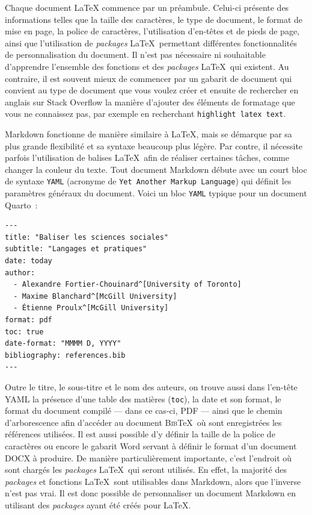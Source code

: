 \documentclass[
  letterpaper,
]{scrbook}
\begin{document}
Chaque document \LaTeX{} commence par un préambule. Celui-ci présente
des informations telles que la taille des caractères, le type de
document, le format de mise en page, la police de caractères,
l'utilisation d'en-têtes et de pieds de page, ainsi que l'utilisation de
\emph{packages} \LaTeX~permettant différentes fonctionnalités de
personnalisation du document. Il n'est pas nécessaire ni souhaitable
d'apprendre l'ensemble des fonctions et des \emph{packages} \LaTeX~qui
existent. Au contraire, il est souvent mieux de commencer par un gabarit
de document qui convient au type de document que vous voulez créer et
ensuite de rechercher en anglais sur Stack Overflow la manière d'ajouter
des éléments de formatage que vous ne connaissez pas, par exemple en
recherchant \texttt{highlight\ latex\ text}.

Markdown fonctionne de manière similaire à \LaTeX, mais se démarque par
sa plus grande flexibilité et sa syntaxe beaucoup plus légère. Par
contre, il nécessite parfois l'utilisation de balises \LaTeX~afin de
réaliser certaines tâches, comme changer la couleur du texte. Tout
document Markdown débute avec un court bloc de syntaxe \texttt{YAML}
(acronyme de \texttt{Yet\ Another\ Markup\ Language}) qui définit les
paramètres généraux du document. Voici un bloc \texttt{YAML} typique
pour un document Quarto~:

\begin{verbatim}
---
title: "Baliser les sciences sociales"
subtitle: "Langages et pratiques"
date: today
author:
  - Alexandre Fortier-Chouinard^[University of Toronto]
  - Maxime Blanchard^[McGill University]
  - Étienne Proulx^[McGill University]
format: pdf
toc: true
date-format: "MMMM D, YYYY"
bibliography: references.bib
---
\end{verbatim}

Outre le titre, le sous-titre et le nom des auteurs, on trouve aussi
dans l'en-tête YAML la présence d'une table des matières (\texttt{toc}),
la date et son format, le format du document compilé --- dans ce cas-ci,
PDF --- ainsi que le chemin d'arborescence afin d'accéder au document
\textsc{Bib}\TeX~où sont enregistrées les références utilisées. Il est
aussi possible d'y définir la taille de la police de caractères ou
encore le gabarit Word servant à définir le format d'un document DOCX à
produire. De manière particulièrement importante, c'est l'endroit où
sont chargés les \emph{packages} \LaTeX~qui seront utilisés. En effet,
la majorité des \emph{packages} et fonctions \LaTeX~sont utilisables
dans Markdown, alors que l'inverse n'est pas vrai. Il est donc possible
de personnaliser un document Markdown en utilisant des \emph{packages}
ayant été créés pour \LaTeX.
\end{document}
